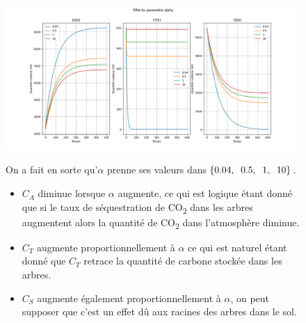 \documentclass[12pt]{article}
\theoremstyle{saav}
\newcommand{\acc}[1]{\hspace{-0.05cm}\left\{#1 \right\}}
\begin{document}
	
	\begin{figure}[htbp]
	\centering
	\begin{minipage}[h]{0.9\linewidth}
		\centering		
		\includegraphics[width=\linewidth]{images/alpha_var.png}
		\par\vspace{0.5em}
		
		
		On a fait en sorte qu'$\alpha$ prenne ses valeurs dans $\acc{0.04,\hspace{2mm} 0.5,\hspace{2mm} 1,\hspace{2mm} 10}$.
		\begin{itemize}[label*=\textbullet]
			\item $C_{A}$ diminue lorsque $\alpha$ augmente, ce qui est logique étant donné que si le taux de séquestration de CO\textsubscript{2} dans les arbres augmentent alors la quantité de CO\textsubscript{2} dans l'atmosphère diminue.
			\item $C_{T}$ augmente proportionnellement à $\alpha$ ce qui est naturel étant donné que $C_{T}$ retrace la quantité de carbone stockée dans les arbres.
			\item $C_{S}$ augmente également proportionnellement à $\alpha$, on peut supposer que c'est un effet dû aux racines des arbres dans le sol.
		\end{itemize}
	\end{minipage}
	\end{figure}
	
\end{document}
